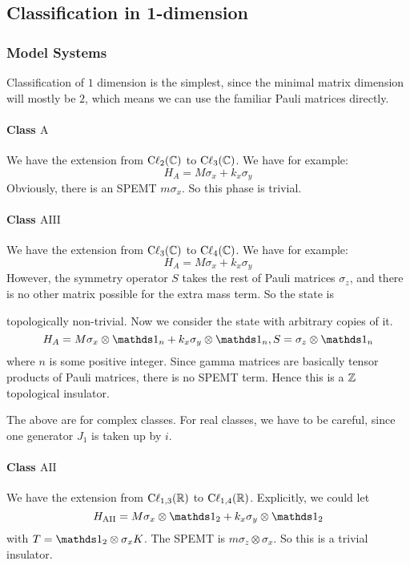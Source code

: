 \subsection{Classification in 1-dimension}
\label{sec:Classification in 1-dimension}

\subsubsection{Model Systems}
\label{sec:Model Systems}
Classification of $1$ dimension is the simplest, since the minimal matrix
dimension will mostly be $2$, which means we can use the familiar Pauli matrices
directly.

\paragraph{Class $\mathrm{A}$} We have the extension from
$\mathrm{C\ell}_{2}(\mathbb{C})$ to $\mathrm{C\ell}_{3}(\mathbb{C})$. We have for example:
\begin{equation}
    H_A = M \sigma_x + k_x \sigma_y
\end{equation}
Obviously, there is an SPEMT $m\sigma_x$. So this phase is trivial.

\paragraph{Class $\mathrm{AIII}$} We have the extension from
$\mathrm{C\ell}_{3}(\mathbb{C})$ to $\mathrm{C\ell}_{4}(\mathbb{C})$. We have
for example:
\begin{equation}
    H_A = M \sigma_x + k_x \sigma_y
\end{equation}
However, the symmetry operator $S$ takes the rest of Pauli matrices $\sigma_z$, and
there is no other matrix possible for the extra mass term. So the state is


topologically non-trivial. Now we consider the state with arbitrary copies of it.
\begin{equation}
    H_A = M \sigma_x\otimes \id_n + k_x\sigma_y\otimes\id_n,
    S=\sigma_z\otimes\id_n
\end{equation}
where $n$ is some positive integer. Since gamma matrices are basically tensor
products of Pauli matrices, there is no SPEMT term. Hence this is a $\mathbb{Z}$
topological insulator.

The above are for complex classes. For real classes, we have to be careful,
since one generator $J_1$ is taken up by $i$.

\paragraph{Class $\mathrm{AII}$} We have the extension from
$\mathrm{C\ell}_{1,3}(\mathbb{R})$ to $\mathrm{C\ell}_{1,4}(\mathbb{R})$.
Explicitly, we could let
\begin{equation}
    H_{\mathrm{AII}} = M\sigma_x\otimes\id_2 + k_x\sigma_y\otimes\id_2
\end{equation}
with $T=\id_2\otimes\sigma_x K$. The SPEMT is $m\sigma_z\otimes\sigma_x$. So
this is a trivial insulator.

